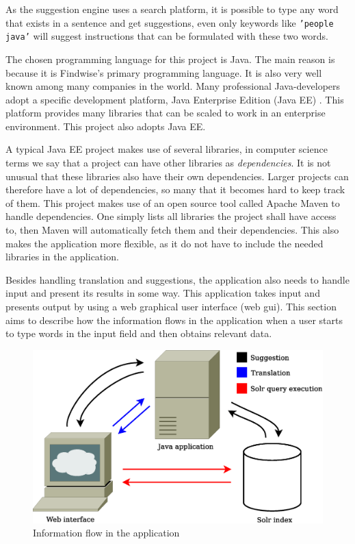 As the suggestion engine uses a search platform, it is possible to type any word that exists in a sentence and get suggestions, even only keywords like \texttt{'people java'} will suggest instructions that can be formulated with these two words.

The chosen programming language for this project is Java. The main reason is because it is Findwise's primary programming language. It is also very well known among many companies in the world.
Many professional Java-developers adopt a specific development platform, Java Enterprise Edition (Java EE) \cite{javaee}. This platform provides many libraries that can be scaled to work in an enterprise environment. This project also adopts Java EE.

A typical Java EE project makes use of several libraries, in computer science terms we say that a project can have other libraries as \emph{dependencies}. It is not unusual that these libraries also have their own dependencies. Larger projects can therefore have a lot of dependencies, so many that it becomes hard to keep track of them. This project makes use of an open source tool called Apache Maven \cite{books/daglib/0021697} to handle dependencies. One simply lists all libraries the project shall have access to, then Maven will automatically fetch them and their dependencies. This also makes the application more flexible, as it do not have to include the needed libraries in the application.

Besides handling translation and suggestions, the application also needs to handle input and present its results in some way. This application takes input and presents output by using a web graphical user interface (web gui).
\newpage
{}
This section aims to describe how the information flows in the application when a user starts to type words in the input field and then obtains relevant data.

\begin{figure}[H]
\includegraphics[scale=0.49,keepaspectratio,valign=t]{./gfx/information_flow.eps}
\caption{Information flow in the application\label{fig:information-flow}}
\end{figure}

